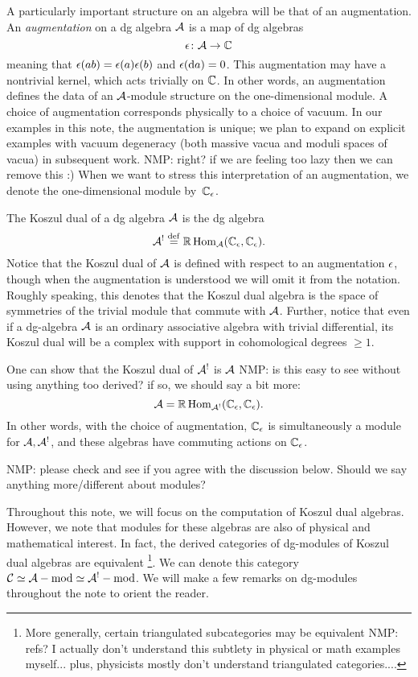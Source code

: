 \documentclass[11pt]{amsart}
\def\natalie#1{{\textcolor{green!65!black}{NMP: {#1}}}}
\begin{document}
A particularly important structure on an algebra will be that of an augmentation. 
An {\em augmentation} on a dg algebra $\mathcal A$ is a map of dg algebras 
\[
\epsilon \colon \mathcal A \to \mathbb C 
\]
meaning that $\epsilon (a b) = \epsilon(a) \epsilon(b)$ and $\epsilon ({\rm d} a) = 0$. This augmentation may have a nontrivial kernel, which acts trivially on $\mathbb C$. 
In other words, an augmentation defines the data of an $\mathcal A$-module structure on the one-dimensional module. A choice of augmentation corresponds physically to a choice of vacuum. In our examples in this note, the augmentation is unique; we plan to expand on explicit examples with vacuum degeneracy (both massive vacua and moduli spaces of vacua) in subsequent work. \natalie{right? if we are feeling too lazy then we can remove this :)}
When we want to stress this interpretation of an augmentation, we denote the one-dimensional module by~$\mathbb C_\epsilon$.


The Koszul dual of a dg algebra $\mathcal A$ is the dg algebra
\[
\mathcal A^! \overset{\rm def}{=} \mathbb{R}\operatorname{Hom}_\mathcal A(\mathbb C_\epsilon,\mathbb C_\epsilon) .
\] 
Notice that the Koszul dual of $\mathcal A$ is defined with respect to an augmentation $\epsilon$, though when the augmentation is understood we will omit it from the notation. Roughly speaking, this denotes that the Koszul dual algebra is the space of symmetries of the trivial module that commute with $\mathcal A$. Further, notice that even if a dg-algebra $\mathcal A$ is an ordinary associative algebra with trivial differential, its Koszul dual will be a complex with support in cohomological degrees $\geq 1$. 

One can show that the Koszul dual of $\mathcal A^{!}$ is $\mathcal A$ \natalie{is this easy to see without using anything too derived? if so, we should say a bit more}:
\[
\mathcal A = \mathbb{R}\operatorname{Hom}_{\mathcal A^!}(\mathbb C_\epsilon, \mathbb C_\epsilon).
\]
In other words, with the choice of augmentation, $\mathbb C_\epsilon$ is simultaneously a module for $\mathcal A, \mathcal A^!$, and these algebras have commuting actions on $\mathbb C_\epsilon$.

\natalie{please check and see if you agree with the discussion below. Should we say anything more/different about modules?}

Throughout this note, we will focus on the computation of Koszul dual algebras. However, we note that modules for these algebras are also of physical and mathematical interest. In fact, the derived categories of dg-modules of Koszul dual algebras are equivalent \footnote{More generally, certain triangulated subcategories may be equivalent \natalie{refs? I actually don't understand this subtlety in physical or math examples myself... plus, physicists mostly don't understand triangulated categories...}.}. We can denote this category $\mathcal C \simeq \mathcal A-{\rm mod} \simeq \mathcal A^!-{\rm mod}$. We will make a few remarks on dg-modules throughout the note to orient the reader. 
\end{document}
